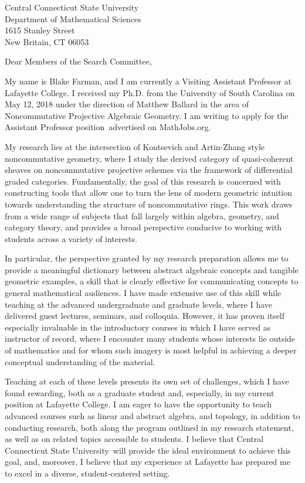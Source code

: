 \documentclass[12pt]{letter}
\date{\today}
\def\school{Central Connecticut State University}
\def\courses{linear and abstract algebra, and topology}
\def\position{Assistant Professor position}
\def\posloc{MathJobs.org}
\begin{document}
\begin{letter}{
    Central Connecticut State University\\
    Department of Mathematical Sciences\\
    1615 Stanley Street\\
    New Britain, CT 06053
  }
  \opening{Dear Members of the Search Committee,}
  
    My name is Blake Farman, and I am currently a Visiting Assistant Professor at Lafayette College.
  I received my Ph.D. from the University of South Carolina on May 12, 2018 under the direction of Matthew Ballard in the area of Noncommutative Projective Algebraic Geometry.
  I am writing to apply for the \position\ advertised on \posloc.

  My research lies at the intersection of Kontsevich and Artin-Zhang style noncommutative geometry, where I study the derived category of quasi-coherent sheaves on noncommutative projective schemes via the framework of differential graded categories.
  Fundamentally, the goal of this research is concerned with constructing tools that allow one to turn the lens of modern geometric intuition towards understanding the structure of noncommutative rings.
  This work draws from a wide range of subjects that fall largely within algebra, geometry, and category theory, and provides a broad perspective conducive to working with students across a variety of interests.
  

  In particular, the perspective granted by my research preparation allows me to provide a meaningful dictionary between abstract algebraic concepts and tangible geometric examples, a skill that is clearly effective for communicating concepts to general mathematical audiences.
  I have made extensive use of this skill while teaching at the advanced undergraduate and graduate levels, where I have delivered guest lectures, seminars, and colloquia.
  However, it has proven itself especially invaluable in the introductory courses in which I have served as instructor of record, where I encounter many students whose interests lie outside of mathematics and for whom such imagery is most helpful in achieving a deeper conceptual understanding of the material.

  Teaching at each of these levels presents its own set of challenges, which I have found rewarding, both as a graduate student and, especially, in my current position at Lafayette College.
  I am eager to have the opportunity to teach advanced courses such as \courses, in addition to conducting research, both along the program outlined in my research statement, as well as on related topics accessible to students.
  I believe that \school\ will provide the ideal environment to achieve this goal, and, moreover, I believe that my experience at Lafayette has prepared me to excel in a diverse, student-centered setting.
  

\end{letter}
\end{document}
